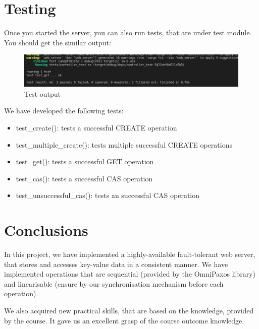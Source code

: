 \documentclass[a4paper, 11pt]{article}
\begin{document}
\section{Testing}

Once you started the server, you can also run tests, that are under test module. You should get the similar output:

\begin{figure}[H]
\centering
\includegraphics[width=\textwidth,keepaspectratio]{Test1.png}
\caption{Test output}
\end{figure}

We have developed the following tests:

\begin{itemize}
	\item test\_create(): tests a successful CREATE operation
	\item test\_multiple\_create(): tests multiple successful CREATE operations
	\item test\_get(): tests a successful GET operation
	\item test\_cas(): tests a successful CAS operation
	\item test\_unsuccessful\_cas(): tests an successful CAS operation
\end{itemize}

\section{Conclusions}
In this project, we have implemented a highly-available fault-tolerant web server, that stores and accesses key-value data in a consistent manner. We have implemented operations that are sequential (provided by the OmniPaxos library) and linearisable (ensure by our synchronisation mechanism before each operation).

We also acquired new practical skills, that are based on the knowledge, provided by the course. It gave us an excellent grasp of the course outcome knowledge.
\end{document}
